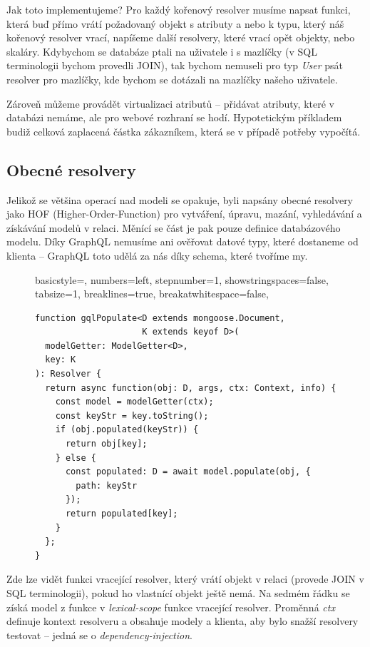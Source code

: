 Jak toto implementujeme? Pro každý kořenový resolver musíme napsat funkci, která buď přímo vrátí požadovaný objekt s atributy a nebo
k typu, který náš kořenový resolver vrací, napíšeme další resolvery, které vrací opět objekty, nebo skaláry.
Kdybychom se databáze ptali na uživatele i s
mazlíčky (v SQL terminologii bychom provedli JOIN), tak bychom nemuseli pro typ \textit{User} psát resolver pro mazlíčky, kde bychom
se dotázali na mazlíčky našeho uživatele.
\citep[viz][]{GraphQLDoc}

Zároveň můžeme provádět virtualizaci atributů -- přidávat atributy, které v databázi nemáme, ale pro webové rozhraní se hodí.
Hypotetickým příkladem budiž celková zaplacená částka zákazníkem, která se v případě potřeby vypočítá.

\subsection{Obecné resolvery}

Jelikož se většina operací nad modeli se opakuje, byli napsány obecné resolvery jako HOF (Higher-Order-Function)
pro vytváření, úpravu, mazání, vyhledávání a získávání modelů v relaci.
Měnící se část je pak pouze definice databázového modelu. Díky GraphQL nemusíme ani ověřovat datové typy, které dostaneme od klienta --
GraphQL toto udělá za nás díky schema, které tvoříme my.

\begin{figure}[!htb]
\lstset
{ %
    basicstyle=\footnotesize,
    numbers=left,
    stepnumber=1,
    showstringspaces=false,
    tabsize=1,
    breaklines=true,
    breakatwhitespace=false,
}
\begin{lstlisting}
function gqlPopulate<D extends mongoose.Document,
                     K extends keyof D>(
  modelGetter: ModelGetter<D>,
  key: K
): Resolver {
  return async function(obj: D, args, ctx: Context, info) {
    const model = modelGetter(ctx);
    const keyStr = key.toString();
    if (obj.populated(keyStr)) {
      return obj[key];
    } else {
      const populated: D = await model.populate(obj, {
        path: keyStr
      });
      return populated[key];
    }
  };
}
\end{lstlisting}
\end{figure}

Zde lze vidět funkci vracející resolver, který vrátí objekt v relaci (provede JOIN v SQL terminologii),
pokud ho vlastnící objekt ještě nemá. Na sedmém řádku se získá model z funkce v \textit{lexical-scope} funkce
vracející resolver. Proměnná \textit{ctx} definuje kontext resolveru a obsahuje modely a klienta, aby
bylo snažší resolvery testovat -- jedná se o \textit{dependency-injection}.

